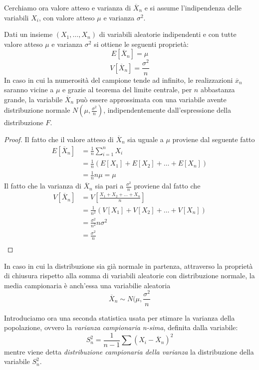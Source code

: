 \documentclass[a4paper,12pt, oneside]{book}
\begin{document}
Cerchiamo ora valore atteso e varianza di $\overline{X}_n$ e si assume l'indipendenza delle variabili $X_i$,
con valore atteso $\mu$ e varianza $\sigma ^ 2$.
\begin{teo}
    Dati un insieme $(X_1, \dots, X_n)$ di variabili aleatorie indipendenti e con tutte valore atteso $\mu$ 
    e varianza $\sigma ^ 2$ si ottiene le seguenti proprietà:
    \[ E[\overline{X}_n] = \mu \]
    \[ V[\overline{X}_n] = \frac{\sigma ^ 2}{n} \]
    In caso in cui la numerosità del campione tende ad infinito, le realizzazioni $\overline{x}_n$ saranno vicine 
    a $\mu$ e grazie al teorema del limite centrale, per $n$ abbastanza grande, la variabile $\overline{X}_n$ può
    essere approssimata con una variabile avente distribuzione normale $N(\mu, \frac{\sigma ^ 2}{n})$, indipendentemente
    dall'espressione della distribuzione $F$.
\end{teo}
\begin{proof}
    Il fatto che il valore atteso di $\overline{X}_n$ sia uguale a $\mu$ proviene dal seguente fatto
    \[ \begin{split}
        E[\overline{X}_n] & = \frac{1}{n} \sum _{i = 1}^n X_i \\
                          & = \frac{1}{n} (E[X_1] + E[X_2] + \dots + E[X_n])\\
                          & = \frac{1}{n} n\mu = \mu
        \end{split} \]
    Il fatto che la varianza di $\overline{X}_n$ sia pari a $\frac{\sigma^2}{n}$ proviene dal fatto che 
    \[ \begin{split}
        V[\overline{X}_n] & = V[\frac{X_1 + X_2 + \dots + X_n}{n}] \\
                          & = \frac{1}{n^2} (V[X_1] + V[X_2] + \dots + V[X_n])\\
                          & = \frac{\sigma^2}{n^2} n\sigma^2 \\
                          & = \frac{\sigma^2}{n}\\
        \end{split} \]
\end{proof}
In caso in cui la distribuzione sia già normale in partenza, attraverso la proprietà di chiusura rispetto alla somma di
variabili aleatorie con distribuzione normale, la media campionaria è anch'essa una variabilie aleatoria
\[ \overline{X}_n \sim N(\mu, \frac{\sigma ^ 2}{n} \]

Introduciamo ora una seconda statistica usata per stimare la varianza della popolazione,
ovvero la \emph{varianza campionaria n-sima}, definita dalla variabile:
\[ S_n ^ 2 = \frac{1}{n - 1} \sum(X_i - \overline{X}_n) ^2 \]
mentre viene detta \emph{distribuzione campionaria della varianza} la distribuzione della variabile $S_n^2$.
\end{document}
